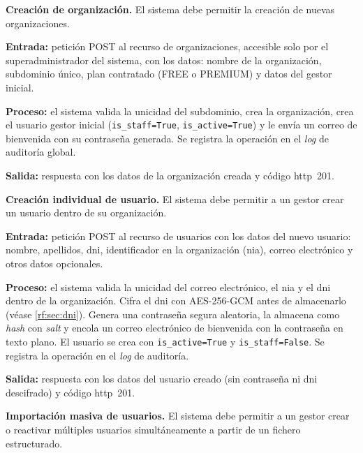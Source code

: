 \begin{functional}

    \item \textbf{Creación de organización.} \label{rf:users:create_org}
    El sistema debe permitir la creación de nuevas organizaciones.

    \textbf{Entrada:} petición POST al recurso de organizaciones, accesible solo por el
    superadministrador del sistema, con los datos: nombre de la organización, subdominio
    único, plan contratado (FREE o PREMIUM) y datos del gestor inicial.

    \textbf{Proceso:} el sistema valida la unicidad del subdominio, crea la organización,
    crea el usuario gestor inicial (\texttt{is\_staff=True}, \texttt{is\_active=True}) y le
    envía un correo de bienvenida con su contraseña generada. Se registra la operación en
    el \textit{log} de auditoría global.

    \textbf{Salida:} respuesta con los datos de la organización creada y código
    \acs{http}~201.

    \item \textbf{Creación individual de usuario.} \label{rf:users:create}
    El sistema debe permitir a un gestor crear un usuario dentro de su organización.

    \textbf{Entrada:} petición POST al recurso de usuarios con los datos del nuevo usuario:
    nombre, apellidos, \acs{dni}, identificador en la organización (\acs{nia}), correo
    electrónico y otros datos opcionales.

    \textbf{Proceso:} el sistema valida la unicidad del correo electrónico, el \acs{nia} y
    el \acs{dni} dentro de la organización. Cifra el \acs{dni} con AES-256-GCM antes de
    almacenarlo (véase \cref{rf:sec:dni}). Genera una contraseña segura aleatoria, la
    almacena como \textit{hash} con \textit{salt} y encola un correo electrónico de
    bienvenida con la contraseña en texto plano. El usuario se crea con
    \texttt{is\_active=True} y \texttt{is\_staff=False}. Se registra la operación en el
    \textit{log} de auditoría.

    \textbf{Salida:} respuesta con los datos del usuario creado (sin contraseña ni
    \acs{dni} descifrado) y código \acs{http}~201.

    \item \textbf{Importación masiva de usuarios.} \label{rf:users:import}
    El sistema debe permitir a un gestor crear o reactivar múltiples usuarios
    simultáneamente a partir de un fichero estructurado.


\end{functional}
